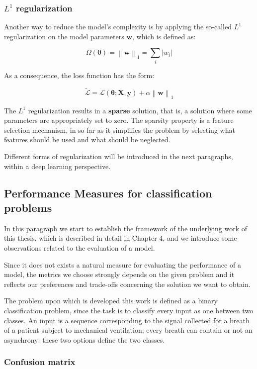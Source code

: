 \documentclass[a4paper, twoside]{article}
\begin{document}
   \subsubsection{$L^1$ regularization}
   Another way to reduce the model's complexity is by applying the so-called $L^1$ regularization on the model parameters $\boldsymbol{w}$, which is defined as:

   $$\Omega(\boldsymbol{\theta}) = \left\|\boldsymbol{w}\right\|_1 = \sum\limits_{i} |w_i| $$

   As a consequence, the loss function has the form:

   $$\widetilde{\mathcal{L}} = \mathcal{L}(\boldsymbol{\theta}; \boldsymbol{X}, \boldsymbol{y}) + \alpha \left\|\boldsymbol{w}\right\|_1 $$

   The $L^1$ regularization results in a \textbf{sparse} solution, that is, a solution where some parameters are appropriately set to zero. The sparsity property is a feature selection mechanism, in so far as it simplifies the problem by selecting what features should be used and what should be neglected.

   Different forms of regularization will be introduced in the next paragraphs, within a deep learning perspective.


    \subsection{Performance Measures for classification problems}

    In this paragraph we start to establish the framework of the underlying work of this thesis, which is described in detail in Chapter 4, and we introduce some observations related to the evaluation of a model.

    Since it does not exists a natural measure for evaluating the performance of a model, the metrics we choose strongly depends on the given problem and it reflects our preferences and trade-offs concerning the solution we want to obtain.

    The problem upon which is developed this work is defined as a binary classification problem, since the task is to classify every input as one between two classes. An input is a sequence corresponding to the signal collected for a breath of a patient subject to mechanical ventilation; every breath can contain or not an asynchrony: these two options define the two classes.

    \subsubsection{Confusion matrix}
\end{document}
